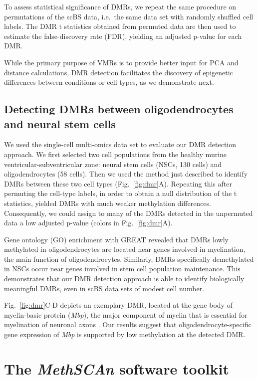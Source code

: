 \documentclass[10pt]{article}
\begin{document}
To assess statistical significance of DMRs, we repeat the same procedure on permutations of the scBS data, i.e.\ the same data set with randomly shuffled cell labels.
The DMR t statistics obtained from permuted data are then used to estimate the false-discovery rate (FDR), yielding an adjusted p-value for each DMR.

While the primary purpose of VMRs is to provide better input for PCA and distance calculations, DMR detection facilitates the discovery of epigenetic differences between conditions or cell types, as we demonstrate next.


\subsection*{Detecting DMRs between oligodendrocytes and neural stem cells}


We used the single-cell multi-omics data set \citep{kremer_scnmt} to evaluate our DMR detection approach.
We first selected two cell populations from the healthy murine ventricular-subventricular zone: neural stem cells (NSCs, 130 cells) and oligodendrocytes (58 cells).
Then we used the method just described to identify DMRs between these two cell types (Fig.~\ref{fig:dmr}A).
Repeating this after permuting the cell-type labels, in order to obtain a null distribution of the t statistics, yielded DMRs with much weaker methylation differences.
Consequently, we could assign to many of the DMRs detected in the unpermuted data a low adjusted p-value (colors in Fig.~\ref{fig:dmr}A).

Gene ontology (GO) enrichment with GREAT \citep{mclean2010great} revealed that DMRs lowly methylated in oligodendrocytes are located near genes involved in myelination, the main function of oligodendrocytes.
Similarly, DMRs specifically demethylated in NSCs occur near genes involved in stem cell population maintenance.
This demonstrates that our DMR detection approach is able to identify biologically meaningful DMRs, even in scBS data sets of modest cell number.

Fig.~\ref{fig:dmr}C-D depicts an exemplary DMR, located at the gene body of myelin-basic protein (\textit{Mbp}), the major component of myelin that is essential for myelination of neuronal axons \citep{mbp}.
Our results suggest that oligodendrocyte-specific gene expression of \textit{Mbp} is supported by low methylation at the detected DMR.


\section*{The \textit{MethSCAn} software toolkit}
\end{document}
